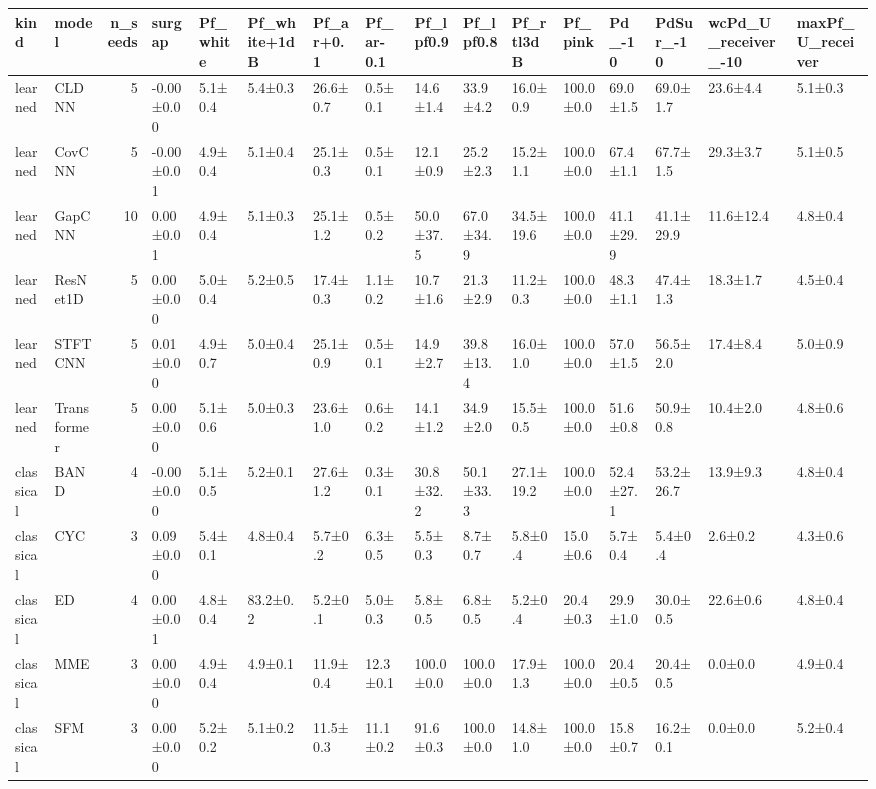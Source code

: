 \begin{tabular}{llrlllllllllllll}
\toprule
kind & model & n\_seeds & surgap & Pf\_white & Pf\_white+1dB & Pf\_ar+0.1 & Pf\_ar-0.1 & Pf\_lpf0.9 & Pf\_lpf0.8 & Pf\_rtl3dB & Pf\_pink & Pd\_-10 & PdSur\_-10 & wcPd\_U\_receiver\_-10 & maxPf\_U\_receiver \\
\midrule
learned & CLDNN & 5 & -0.00±0.00 & 5.1±0.4 & 5.4±0.3 & 26.6±0.7 & 0.5±0.1 & 14.6±1.4 & 33.9±4.2 & 16.0±0.9 & 100.0±0.0 & 69.0±1.5 & 69.0±1.7 & 23.6±4.4 & 5.1±0.3 \\
learned & CovCNN & 5 & -0.00±0.01 & 4.9±0.4 & 5.1±0.4 & 25.1±0.3 & 0.5±0.1 & 12.1±0.9 & 25.2±2.3 & 15.2±1.1 & 100.0±0.0 & 67.4±1.1 & 67.7±1.5 & 29.3±3.7 & 5.1±0.5 \\
learned & GapCNN & 10 & 0.00±0.01 & 4.9±0.4 & 5.1±0.3 & 25.1±1.2 & 0.5±0.2 & 50.0±37.5 & 67.0±34.9 & 34.5±19.6 & 100.0±0.0 & 41.1±29.9 & 41.1±29.9 & 11.6±12.4 & 4.8±0.4 \\
learned & ResNet1D & 5 & 0.00±0.00 & 5.0±0.4 & 5.2±0.5 & 17.4±0.3 & 1.1±0.2 & 10.7±1.6 & 21.3±2.9 & 11.2±0.3 & 100.0±0.0 & 48.3±1.1 & 47.4±1.3 & 18.3±1.7 & 4.5±0.4 \\
learned & STFTCNN & 5 & 0.01±0.00 & 4.9±0.7 & 5.0±0.4 & 25.1±0.9 & 0.5±0.1 & 14.9±2.7 & 39.8±13.4 & 16.0±1.0 & 100.0±0.0 & 57.0±1.5 & 56.5±2.0 & 17.4±8.4 & 5.0±0.9 \\
learned & Transformer & 5 & 0.00±0.00 & 5.1±0.6 & 5.0±0.3 & 23.6±1.0 & 0.6±0.2 & 14.1±1.2 & 34.9±2.0 & 15.5±0.5 & 100.0±0.0 & 51.6±0.8 & 50.9±0.8 & 10.4±2.0 & 4.8±0.6 \\
classical & BAND & 4 & -0.00±0.00 & 5.1±0.5 & 5.2±0.1 & 27.6±1.2 & 0.3±0.1 & 30.8±32.2 & 50.1±33.3 & 27.1±19.2 & 100.0±0.0 & 52.4±27.1 & 53.2±26.7 & 13.9±9.3 & 4.8±0.4 \\
classical & CYC & 3 & 0.09±0.00 & 5.4±0.1 & 4.8±0.4 & 5.7±0.2 & 6.3±0.5 & 5.5±0.3 & 8.7±0.7 & 5.8±0.4 & 15.0±0.6 & 5.7±0.4 & 5.4±0.4 & 2.6±0.2 & 4.3±0.6 \\
classical & ED & 4 & 0.00±0.01 & 4.8±0.4 & 83.2±0.2 & 5.2±0.1 & 5.0±0.3 & 5.8±0.5 & 6.8±0.5 & 5.2±0.4 & 20.4±0.3 & 29.9±1.0 & 30.0±0.5 & 22.6±0.6 & 4.8±0.4 \\
classical & MME & 3 & 0.00±0.00 & 4.9±0.4 & 4.9±0.1 & 11.9±0.4 & 12.3±0.1 & 100.0±0.0 & 100.0±0.0 & 17.9±1.3 & 100.0±0.0 & 20.4±0.5 & 20.4±0.5 & 0.0±0.0 & 4.9±0.4 \\
classical & SFM & 3 & 0.00±0.00 & 5.2±0.2 & 5.1±0.2 & 11.5±0.3 & 11.1±0.2 & 91.6±0.3 & 100.0±0.0 & 14.8±1.0 & 100.0±0.0 & 15.8±0.7 & 16.2±0.1 & 0.0±0.0 & 5.2±0.4 \\
\bottomrule
\end{tabular}
